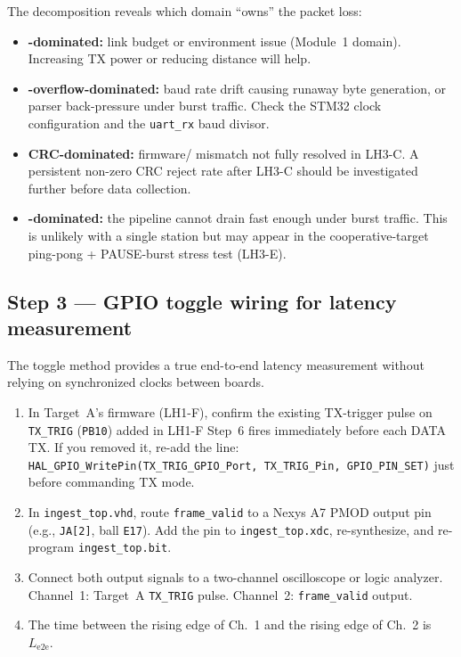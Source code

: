 \documentclass[11pt,letterpaper]{article}
\begin{document}
\begin{tcolorbox}[infobox={Interpreting PER Decomposition}]
	The decomposition reveals which domain ``owns'' the packet loss:
	\begin{itemize}[leftmargin=1.2em]
		\item \textbf{\RF{}-dominated:} link budget or environment issue (Module~1 domain). Increasing TX power or reducing distance will help.
		\item \textbf{\FIFO{}-overflow-dominated:} baud rate drift causing runaway byte generation, or parser back-pressure under burst traffic. Check the STM32 clock configuration and the \VHDL{} \texttt{uart\_rx} baud divisor.
		\item \textbf{\mbox{CRC}-dominated:} firmware/\RTL{} mismatch not fully resolved in LH3-C. A persistent non-zero \mbox{CRC} reject rate after LH3-C should be investigated further before data collection.
		\item \textbf{\FIFO{}-dominated:} the pipeline cannot drain fast enough under burst traffic. This is unlikely with a single station but may appear in the cooperative-target ping-pong + PAUSE-burst stress test (LH3-E).
	\end{itemize}
\end{tcolorbox}

\newpage
\subsection{Step 3 --- GPIO toggle wiring for latency measurement}
The \GPIO{} toggle method provides a true end-to-end latency measurement without relying on synchronized clocks between boards.

\begin{enumerate}[leftmargin=2em]
	\item In Target~A's firmware (LH1-F), confirm the existing TX-trigger \GPIO{} pulse on \texttt{TX\_TRIG} (\texttt{PB10}) added in LH1-F Step~6 fires immediately before each DATA TX. If you removed it, re-add the line: \texttt{HAL\_GPIO\_WritePin(TX\_TRIG\_GPIO\_Port, TX\_TRIG\_Pin, GPIO\_PIN\_SET)} just before commanding TX mode.
	\item In \texttt{ingest\_top.vhd}, route \texttt{frame\_valid} to a Nexys A7 \mbox{PMOD} output pin (e.g., \texttt{JA[2]}, ball \texttt{E17}). Add the pin to \texttt{ingest\_top.xdc}, re-synthesize, and re-program \texttt{ingest\_top.bit}.
	\item Connect both output signals to a two-channel oscilloscope or logic analyzer. Channel~1: Target~A \texttt{TX\_TRIG} pulse. Channel~2: \FPGA{} \texttt{frame\_valid} output.
	\item The time between the rising edge of Ch.~1 and the rising edge of Ch.~2 is $L_{\text{e2e}}$.
\end{enumerate}
\end{document}
